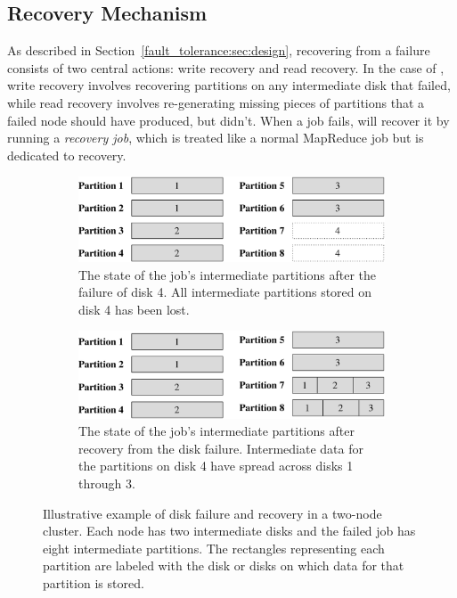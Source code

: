 \subsection{Recovery Mechanism}
\label{sec:recovery}

As described in Section~\ref{fault_tolerance:sec:design}, recovering from a
failure consists of two central actions: write recovery and read recovery. In
the case of \themis, write recovery involves recovering partitions on any
intermediate disk that failed, while read recovery involves re-generating
missing pieces of partitions that a failed node should have produced, but
didn't. When a job fails, \themis will recover it by running a \emph{recovery
  job}, which is treated like a normal MapReduce job but is dedicated to
recovery.

\begin{figure}
  \centering
  \begin{subfigure}[t]{\columnwidth}
    \centering
    \includegraphics[width=\textwidth]{fault_tolerance/figures/disk_failure_before_recovery}
    \caption{\label{fig:disk_fail_before} The state of the job's intermediate
      partitions after the failure of disk 4. All intermediate partitions
      stored on disk 4 has been lost.}
  \end{subfigure}\hspace{0.05\textwidth}
  \begin{subfigure}[t]{\columnwidth}
    \centering
    \includegraphics[width=\textwidth]{fault_tolerance/figures/disk_failure_after_recovery}
    \caption{\label{fig:disk_fail_after} The state of the job's intermediate
      partitions after recovery from the disk failure. Intermediate data for
      the partitions on disk 4 have spread across disks 1 through 3.}
  \end{subfigure}
  \caption{\label{fig:disk_fail} Illustrative example of disk failure and
    recovery in a two-node cluster. Each node has two intermediate disks and
    the failed job has eight intermediate partitions. The rectangles
    representing each partition are labeled with the disk or disks on which
    data for that partition is stored.}
\end{figure}

